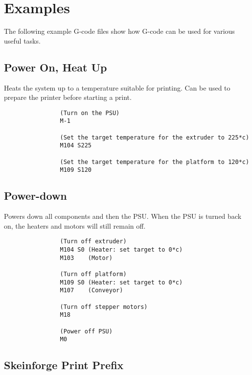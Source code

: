 			
	
	\section{Examples}
		
		The following example G-code files show how G-code can be used for various
		useful tasks.
		
		\subsection{Power On, Heat Up}
			
			Heats the system up to a temperature suitable for printing. Can be used to
			prepare the printer before starting a print.
			
			\begin{verbatim}
				(Turn on the PSU)
				M-1
				
				(Set the target temperature for the extruder to 225*c)
				M104 S225
				
				(Set the target temperature for the platform to 120*c)
				M109 S120
			\end{verbatim}
			
		\subsection{Power-down}
			
			Powers down all components and then the PSU. When the PSU is turned back
			on, the heaters and motors will still remain off.
			
			\begin{verbatim}
				(Turn off extruder)
				M104 S0 (Heater: set target to 0*c)
				M103    (Motor)
				
				(Turn off platform)
				M109 S0 (Heater: set target to 0*c)
				M107    (Conveyor)
				
				(Turn off stepper motors)
				M18
				
				(Power off PSU)
				M0
			\end{verbatim}
		
		\subsection{Skeinforge Print Prefix}
			
